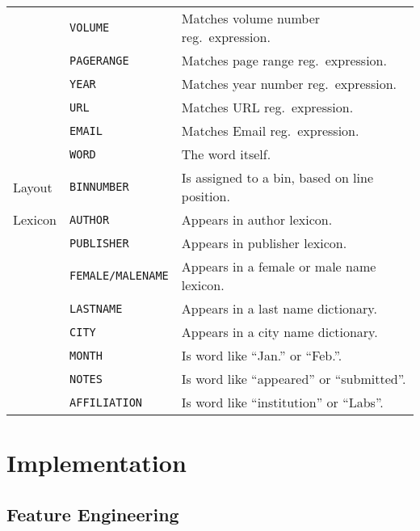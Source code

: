 {\begin{minipage}[c]{\linewidth}
\begin{tabular}{l l l}
          & \texttt{VOLUME}           & Matches volume number reg.\ expression.\\
          & \texttt{PAGERANGE}        & Matches page range reg.\ expression.\\
          & \texttt{YEAR}             & Matches year number reg.\ expression.\\
          & \texttt{URL}              & Matches URL reg.\ expression.\\
          & \texttt{EMAIL}            & Matches Email reg.\ expression.\\
          & \texttt{WORD}             & The word itself.\\
  \midrule
  Layout  & \texttt{BINNUMBER}        & Is assigned to a bin, based on line position.\\
  \midrule
  Lexicon & \texttt{AUTHOR}           & Appears in author lexicon.\\
          & \texttt{PUBLISHER}        & Appears in publisher lexicon.\\
          & \texttt{FEMALE/MALENAME}  & Appears in a female or male name lexicon.\\
          & \texttt{LASTNAME}         & Appears in a last name dictionary.\\
          & \texttt{CITY}             & Appears in a city name dictionary.\\
          & \texttt{MONTH}            & Is word like ``Jan.'' or ``Feb.''.\\
          & \texttt{NOTES}            & Is word like ``appeared'' or ``submitted''.\\
          & \texttt{AFFILIATION}      & Is word like ``institution'' or ``Labs''.\\
  \bottomrule
\end{tabular}
\label{tab:feature-descriptions}
\end{minipage}
}

\chapter{Implementation}\label{app:cha-implementation}
\section{Feature Engineering}\label{app:sec-feature-engineering}

